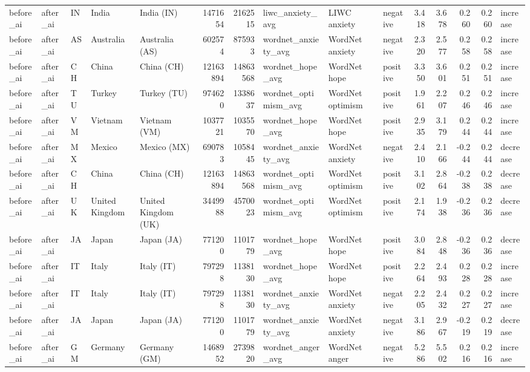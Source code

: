 \begin{tabular}{lllllrrlllrrrrl}
before\_ai & after\_ai & IN & India & India (IN) & 1471654 & 2162515 & liwc\_anxiety\_avg & LIWC anxiety & negative & 3.418 & 3.678 & 0.260 & 0.260 & increase \\
before\_ai & after\_ai & AS & Australia & Australia (AS) & 602574 & 875933 & wordnet\_anxiety\_avg & WordNet anxiety & negative & 2.320 & 2.577 & 0.258 & 0.258 & increase \\
before\_ai & after\_ai & CH & China & China (CH) & 12163894 & 14863568 & wordnet\_hope\_avg & WordNet hope & positive & 3.350 & 3.601 & 0.251 & 0.251 & increase \\
before\_ai & after\_ai & TU & Turkey & Turkey (TU) & 974620 & 1338637 & wordnet\_optimism\_avg & WordNet optimism & positive & 1.961 & 2.207 & 0.246 & 0.246 & increase \\
before\_ai & after\_ai & VM & Vietnam & Vietnam (VM) & 1037721 & 1035570 & wordnet\_hope\_avg & WordNet hope & positive & 2.935 & 3.179 & 0.244 & 0.244 & increase \\
before\_ai & after\_ai & MX & Mexico & Mexico (MX) & 690783 & 1058445 & wordnet\_anxiety\_avg & WordNet anxiety & negative & 2.410 & 2.166 & -0.244 & 0.244 & decrease \\
before\_ai & after\_ai & CH & China & China (CH) & 12163894 & 14863568 & wordnet\_optimism\_avg & WordNet optimism & positive & 3.102 & 2.864 & -0.238 & 0.238 & decrease \\
before\_ai & after\_ai & UK & United Kingdom & United Kingdom (UK) & 3449988 & 4570023 & wordnet\_optimism\_avg & WordNet optimism & positive & 2.174 & 1.938 & -0.236 & 0.236 & decrease \\
before\_ai & after\_ai & JA & Japan & Japan (JA) & 771200 & 1101779 & wordnet\_hope\_avg & WordNet hope & positive & 3.084 & 2.848 & -0.236 & 0.236 & decrease \\
before\_ai & after\_ai & IT & Italy & Italy (IT) & 797298 & 1138130 & wordnet\_hope\_avg & WordNet hope & positive & 2.264 & 2.493 & 0.228 & 0.228 & increase \\
before\_ai & after\_ai & IT & Italy & Italy (IT) & 797298 & 1138130 & wordnet\_anxiety\_avg & WordNet anxiety & negative & 2.205 & 2.432 & 0.227 & 0.227 & increase \\
before\_ai & after\_ai & JA & Japan & Japan (JA) & 771200 & 1101779 & wordnet\_anxiety\_avg & WordNet anxiety & negative & 3.186 & 2.967 & -0.219 & 0.219 & decrease \\
before\_ai & after\_ai & GM & Germany & Germany (GM) & 1468952 & 2739820 & wordnet\_anger\_avg & WordNet anger & negative & 5.286 & 5.502 & 0.216 & 0.216 & increase \\

\end{tabular}
